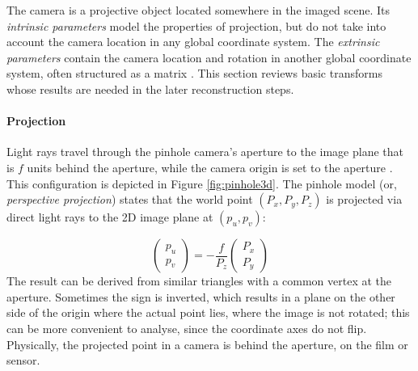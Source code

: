 
The camera is a projective object located somewhere in the imaged scene.
Its \emph{intrinsic parameters} model the properties of projection, but do not take into account the camera location in any global coordinate system.
The \emph{extrinsic parameters} contain the camera location and rotation in another global coordinate system, often structured as a matrix \cite[p. 41]{hartley03multiview}. %
This section reviews basic transforms whose results are needed in the later reconstruction steps.


\paragraph{Projection}
Light rays travel through the pinhole camera's aperture to the image plane that is $f$ units behind the aperture, while the camera origin is set to the aperture \cite{hartley03multiview}.
This configuration is depicted in Figure \ref{fig:pinhole3d}.
The pinhole model (or, \emph{perspective projection}) states that the world point $(P_x, P_y, P_z)$ is projected via direct light rays to the 2D image plane at $(p_u, p_v)$:

\begin{equation}
\begin{pmatrix}
p_u \\ p_v
\end{pmatrix}
=
-\frac{f}{P_z} \begin{pmatrix}
P_x \\ P_y
\end{pmatrix}
\end{equation}
The result can be derived from similar triangles with a common vertex at the aperture.
Sometimes the sign is inverted, which results in a plane on the other side of the origin where the actual point lies, where the image is not rotated; this can be more convenient to analyse, since the coordinate axes do not flip.
Physically, the projected point in a camera is behind the aperture, on the film or sensor.

